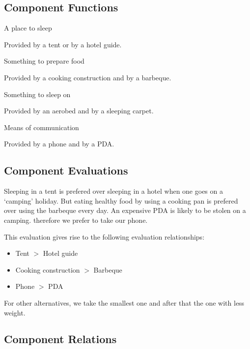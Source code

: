 \documentclass[a4paper,11pt]{article}
\begin{document}
\subsection*{Component Functions}

\begin{description}

\item{A place to sleep}

Provided by a tent or by a hotel guide.

\item{Something to prepare food}

Provided by a cooking construction and by a barbeque.

\item{Something to sleep on}

Provided by an aerobed and by a sleeping carpet.

\item{Means of communication}

Provided by a phone and by a PDA.

\end{description}


\subsection*{Component Evaluations}

Sleeping in a tent is prefered over sleeping in a hotel
when one goes on a `camping' holiday. But eating healthy
food by using a cooking pan is prefered over using the
barbeque every day. An expensive PDA is likely to be stolen
on a camping. therefore we prefer to take our phone.

This evaluation gives rise to the following evaluation
relationships:

\begin{itemize}
\item Tent $>$ Hotel guide
\item Cooking construction $>$ Barbeque
\item Phone $>$ PDA
\end{itemize}

For other alternatives, we take the smallest one and after
that the one with less weight.


\subsection*{Component Relations}
\end{document}
